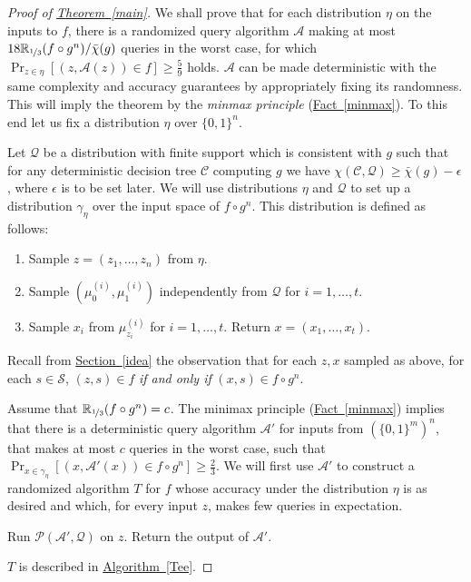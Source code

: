 \documentclass[11pt]{article}
\numberwithin{equation}{section}
\theoremstyle{definition}
\theoremstyle{plain}
\newcommand{\R}{\mathbb R}
\newcommand{\expref}[2]{\hyperref[#2]{#1~\ref{#2}}}
\newcommand{\dr}{\nicefrac}
\newcommand{\cA}{\mathcal{A}}
\newcommand{\clC}{\mathcal{C}}
\newcommand{\clQ}{\mathcal{Q}}
\newcommand{\clP}{\mathcal{P}}
\begin{document}
\begin{proof}[Proof of {\expref{Theorem}{main}}]
We shall prove that for each distribution $\eta$ on the inputs to $f$, there is a randomized query algorithm $\cA$ making at most $18\R_{\dr13}(f \circ g^n) /\bar \chi(g)$ queries in the worst case, for which $\Pr_{z \in \eta}[(z,\cA(z)) \in f] \geq \frac{5}{9}$ holds. $\cA$ can be made deterministic with the same complexity and accuracy guarantees by appropriately fixing its randomness. This will imply the theorem by the \emph{minmax principle} (\expref{Fact}{minmax}). To this end let us fix a distribution $\eta$ over $\{0,1\}^n$.

Let $\clQ$ be a distribution with finite support which is consistent with $g$ such that for any deterministic decision tree $\clC$ computing $g$ we have $\chi(\clC,\clQ) \ge \bar \chi(g)-\epsilon$, where $\epsilon$ is to be set later.
We will use distributions $\eta$ and $\clQ$ to set up a distribution $\gamma_\eta$ over the  input space of $f \circ g^n$.  This distribution is defined as follows:
\begin{enumerate}
\item Sample $z =(z_1, \ldots, z_n)$ from $\eta$.
\item Sample $(\mu_0^{(i)}, \mu_1^{(i)})$ independently from $\clQ$ for $i = 1, \ldots, t$.
\item Sample $x_i$ from $\mu_{z_i}^{(i)}$ for $i=1, \ldots, t$. Return $x = (x_1, \ldots, x_t)$.
\end{enumerate}
Recall from \expref{Section}{idea} the observation that for each $z, x$ sampled as above, for each $s \in \mathcal{S}$, $(z,s) \in f$ \emph{if and only if} $(x,s) \in f \circ g^n$.

Assume that $\R_{\dr13}(f \circ g^n)=c$. The minimax principle (\expref{Fact}{minmax}) implies that there is a deterministic query algorithm $\cA'$ for inputs from $\left(\{0,1\}^m\right)^n$, that makes at most $c$ queries in the worst case, such that $\Pr_{x \in \gamma_\eta}[(x,\cA'(x)) \in f \circ g^n] \geq \frac{2}{3}$. We will first use $\cA'$ to construct a randomized algorithm $T$ for $f$ whose accuracy under the distribution $\eta$ is as desired and which, for every input $z$, 
makes few queries in expectation.
\begin{algorithm}[!h]
\DontPrintSemicolon
\caption{ $T$}
\label{Tee}
Run $\clP(\cA', \clQ)$ on $z$. \;
Return the output of $\cA'$. 
\end{algorithm}
$T$ is described in \expref{Algorithm}{Tee}.


\end{proof}
\end{document}
